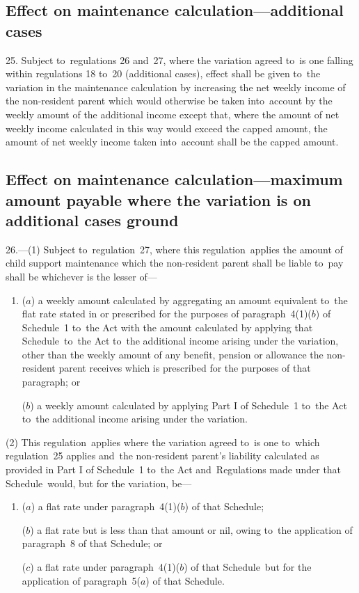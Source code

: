 \documentclass[12pt,a4paper]{article}
\begin{document}
\subsection[25. Effect on maintenance calculation—additional cases]{Effect on maintenance calculation—additional cases}

25.  Subject to~regulations 26 and~27, where the variation agreed to~is one falling within regulations 18 to~20 (additional cases), effect shall be given to~the variation in the maintenance calculation by increasing the net weekly income of the non-resident parent which would otherwise be taken into~account by the weekly amount of the additional income except that, where the amount of net weekly income calculated in this way would exceed the capped amount, the amount of net weekly income taken into~account shall be the capped amount.

\subsection[26. Effect on maintenance calculation—maximum amount payable where the variation is on additional cases ground]{\sloppy Effect on maintenance calculation—maximum amount payable where the variation is on additional cases ground}

26.---(1)  Subject to~regulation~27, where this regulation~applies the amount of child support maintenance which the non-resident parent shall be liable to~pay shall be whichever is the lesser of—
\begin{enumerate}\item[]
($a$) a weekly amount calculated by aggregating an amount equivalent to~the flat rate stated in or prescribed for the purposes of paragraph~4(1)($b$)  of Schedule~1 to~the Act with the amount calculated by applying that Schedule~to~the Act to~the additional income arising under the variation, other than the weekly amount of any benefit, pension or allowance the non-resident parent receives which is prescribed for the purposes of that paragraph; or

($b$) a weekly amount calculated by applying Part I of Schedule~1 to~the Act to~the additional income arising under the variation.
\end{enumerate}

(2) This regulation~applies where the variation agreed to~is one to~which regulation~25 applies and~the non-resident parent’s liability calculated as provided in Part I of Schedule~1 to~the Act and~Regulations made under that Schedule~would, but for the variation, be—
\begin{enumerate}\item[]
($a$) a flat rate under paragraph~4(1)($b$)  of that Schedule;

($b$) a flat rate but is less than that amount or nil, owing to~the application of paragraph~8 of that Schedule; or

($c$) a flat rate under paragraph~4(1)($b$)  of that Schedule~but for the application of paragraph~5($a$)  of that Schedule.
\end{enumerate}
\end{document}
